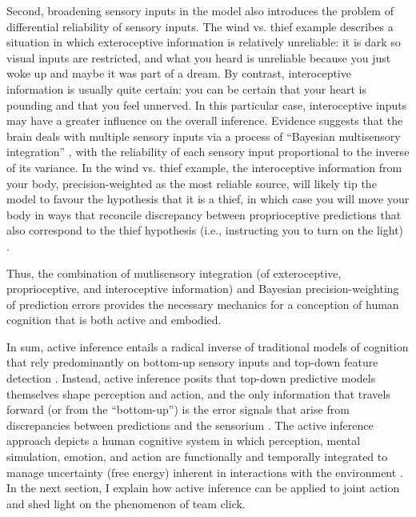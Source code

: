 \begin{CJK}{UTF8}{gbsn}
Second, broadening sensory inputs in the model also introduces the problem of differential reliability of sensory inputs.  The wind vs. thief example describes a situation in which exteroceptive information is relatively unreliable: it is dark so visual inputs are restricted, and what you heard is unreliable because you just woke up and maybe it was part of a dream.  By contrast, interoceptive information is usually quite certain: you can be certain that your heart is pounding and that you feel unnerved.  In this particular case, interoceptive inputs may have a greater influence on the overall inference.  Evidence suggests that the brain deals with multiple sensory inputs via a process of ``Bayesian multisensory integration'' \citep{Ernst2004}, with the reliability of each sensory input proportional to the inverse of its variance.  In the wind vs. thief example, the interoceptive information from your body, precision-weighted as the most reliable source, will likely tip the model to favour the hypothesis that it is a thief, in which case you will move your body in ways that reconcile discrepancy between proprioceptive predictions that also correspond to the thief hypothesis (i.e., instructing you to turn on the light) \citep{Pezzulo2014}.

Thus, the combination of mutlisensory integration (of exteroceptive, proprioceptive, and interoceptive information) and Bayesian precision-weighting of prediction errors provides the necessary mechanics for a conception of human cognition that is both active and embodied.


In sum, active inference \citep[and the predictive coding paradigm which it extends, see][]{Clark2013} entails a radical inverse of traditional models of cognition that rely predominantly on bottom-up sensory inputs and top-down feature detection \citep[e.g.,][]{Marr1985}. Instead, active inference posits that top-down predictive models themselves shape perception and action, and the only information that travels forward (or from the ``bottom-up'') is the error signals that arise from discrepancies between predictions and the sensorium \citep{Pickering2014}.  The active inference approach depicts a human cognitive system in which perception, mental simulation, emotion, and action are functionally and temporally integrated to manage uncertainty (free energy) inherent in interactions with the environment \citep{Clark2013}.  In the next section, I explain how active inference can be applied to joint action and shed light on the phenomenon of team click.


\end{CJK}

